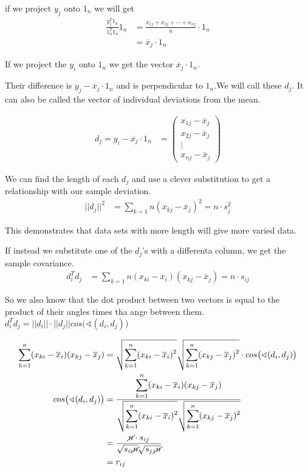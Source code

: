 if we project $y_j$ onto $1_n$ we will get
\begin{align*}
 \frac{y_j^T 1_n}{1_n^T 1_n} 1_n &= \frac{x_{1j}+x_{2j}+\cdots +x_{nj}}{n} \cdot 1_n   \\
 &= \overline{x}_j \cdot 1_n
\end{align*}


If we project the $y_i$ onto $1_n$ we get the vector $\overline{x}_j \cdot 1_n$. 

Their difference is $y_j-\overline{x}_j\cdot 1_n$ and is perpendicular to $1_n$.We will call these $d_j$. It can also be called the vector of individual deviations from the mean.


\begin{align*}
    d_j = y_i -\overline{x_j} \cdot 1_n &= \begin{pmatrix}
    x_{1j} -\overline{x}_j \\
    x_{2j} -\overline{x}_j \\
    \vdots \\
    x_{nj} -\overline{x}_j
    \end{pmatrix}
\end{align*}

We can find the length of each $d_j$ and use a clever substitution to get a relationship with our sample deviation.
\begin{align*}
    ||d_j||^2&= \displaystyle\sum_{k=1}{n}(x_{kj}-\overline{x}_j)^2 = n \cdot s_j^2
\end{align*}

This demonstrates that data sets with more length will give more varied data.

If instead we substitute one of the $d_j$'s with a differenta column, we get the sample covariance.
\begin{align*}
d^T_i d_j &= \displaystyle\sum_{k=1}{n}(x_{ki}-\overline{x}_i)(x_{kj}-\overline{x}_j) =n\cdot s_{ij}
\end{align*}

So we also know that the dot product between two vectors is equal to the product of their angles times tha ange between them.
$d^T_i d_j = ||d_i|| \cdot ||d_j|| cos \big( \sphericalangle (d_i,d_j) \big)$

\begin{align*}
    \displaystyle\sum_{k=1}^{n} (x_{ki}-\overline{x}_i)(x_{kj}-\overline{x}_j) &= \sqrt{\displaystyle\sum_{k=1}^{n} (x_{ki} -\overline{x}_i)^2} \sqrt{\displaystyle\sum_{k=1}^{n} (x_{kj} -\overline{x}_j)^2} \cdot cos \big( \sphericalangle (d_i,d_j) \big) \\
    cos \big( \sphericalangle (d_i,d_j) \big) &= \frac{\displaystyle\sum_{k=1}^{n} (x_{ki}-\overline{x}_i)(x_{kj}-\overline{x}_j)}{\sqrt{\displaystyle\sum_{k=1}^{n} (x_{ki} -\overline{x}_i)^2} \sqrt{\displaystyle\sum_{k=1}^{n} (x_{kj} -\overline{x}_j)^2}} \\
    &= \frac{\cancel{n} \cdot s_{ij}}{\sqrt{s_{ii} \cancel{n}} \sqrt{s_{jj} \cancel{n}}}\\
    &= r_{ij}
\end{align*}

